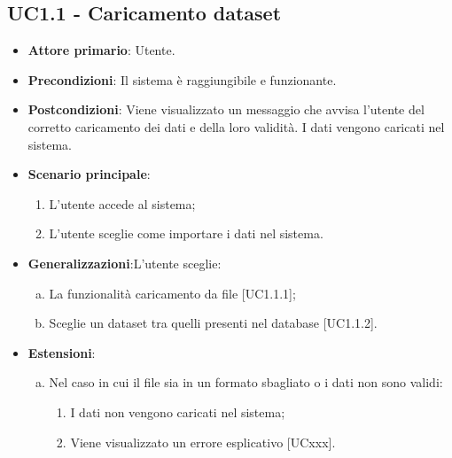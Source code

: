 \subsection{UC1.1 - Caricamento dataset}

\begin{itemize}
	\item \textbf{Attore primario}: Utente.
	\item \textbf{Precondizioni}: Il sistema è raggiungibile e funzionante.
	\item \textbf{Postcondizioni}: Viene visualizzato un messaggio che avvisa l'utente del corretto caricamento dei dati e della loro validità. I dati vengono caricati nel sistema.
	\item \textbf{Scenario principale}:
		\begin{enumerate}
			\item L'utente accede al sistema;
			\item L'utente sceglie come importare i dati nel sistema.
			
		\end{enumerate}
		
	\item \textbf{Generalizzazioni}:L'utente sceglie:
	\begin{enumerate}[(a)]
			\item La funzionalità caricamento da file [UC1.1.1];
			\item Sceglie un dataset tra quelli presenti nel database [UC1.1.2].
			\end{enumerate}
	
	\item \textbf{Estensioni}:
	\begin{enumerate}[(a)]
		\item Nel caso in cui il file sia in un formato sbagliato o i dati non sono validi:
		\begin{enumerate}[1.]
			\item I dati non vengono caricati nel sistema;
			\item Viene visualizzato un errore esplicativo [UCxxx].
		\end{enumerate}
	\end{enumerate}
\end{itemize}

